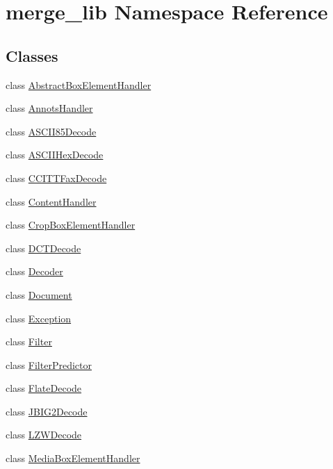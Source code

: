 \hypertarget{namespacemerge__lib}{\section{merge\-\_\-lib Namespace Reference}
\label{d2/d27/namespacemerge__lib}
}
\subsection*{Classes}
\begin{DoxyCompactItemize}
\item 
class \hyperlink{classmerge__lib_1_1_abstract_box_element_handler}{Abstract\-Box\-Element\-Handler}
\item 
class \hyperlink{classmerge__lib_1_1_annots_handler}{Annots\-Handler}
\item 
class \hyperlink{classmerge__lib_1_1_a_s_c_i_i85_decode}{A\-S\-C\-I\-I85\-Decode}
\item 
class \hyperlink{classmerge__lib_1_1_a_s_c_i_i_hex_decode}{A\-S\-C\-I\-I\-Hex\-Decode}
\item 
class \hyperlink{classmerge__lib_1_1_c_c_i_t_t_fax_decode}{C\-C\-I\-T\-T\-Fax\-Decode}
\item 
class \hyperlink{classmerge__lib_1_1_content_handler}{Content\-Handler}
\item 
class \hyperlink{classmerge__lib_1_1_crop_box_element_handler}{Crop\-Box\-Element\-Handler}
\item 
class \hyperlink{classmerge__lib_1_1_d_c_t_decode}{D\-C\-T\-Decode}
\item 
class \hyperlink{classmerge__lib_1_1_decoder}{Decoder}
\item 
class \hyperlink{classmerge__lib_1_1_document}{Document}
\item 
class \hyperlink{classmerge__lib_1_1_exception}{Exception}
\item 
class \hyperlink{classmerge__lib_1_1_filter}{Filter}
\item 
class \hyperlink{classmerge__lib_1_1_filter_predictor}{Filter\-Predictor}
\item 
class \hyperlink{classmerge__lib_1_1_flate_decode}{Flate\-Decode}
\item 
class \hyperlink{classmerge__lib_1_1_j_b_i_g2_decode}{J\-B\-I\-G2\-Decode}
\item 
class \hyperlink{classmerge__lib_1_1_l_z_w_decode}{L\-Z\-W\-Decode}
\item 
class \hyperlink{classmerge__lib_1_1_media_box_element_handler}{Media\-Box\-Element\-Handler}

\end{DoxyCompactItemize}
